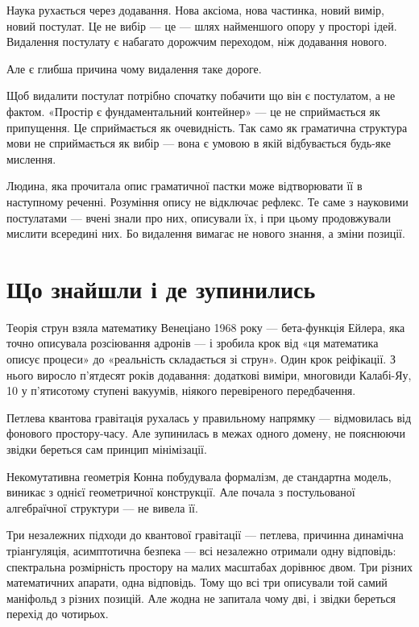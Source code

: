 \documentclass[12pt, a4paper, openany]{book}
\begin{document}
Наука рухається через додавання. Нова аксіома, нова частинка, новий вимір, новий постулат. Це не вибір — це — шлях найменшого опору у просторі ідей. Видалення постулату є набагато дорожчим переходом, ніж додавання нового.

Але є глибша причина чому видалення таке дороге.

Щоб видалити постулат потрібно спочатку побачити що він є постулатом, а не фактом. «Простір є фундаментальний контейнер» — це не сприймається як припущення. Це сприймається як очевидність. Так само як граматична структура мови не сприймається як вибір — вона є умовою в якій відбувається будь-яке мислення.

Людина, яка прочитала опис граматичної пастки може відтворювати її в наступному реченні. Розуміння опису не відключає рефлекс. Те саме з науковими постулатами — вчені знали про них, описували їх, і при цьому продовжували мислити всередині них. Бо видалення вимагає не нового знання, а зміни позиції.

\section{Що знайшли і де зупинились}

Теорія струн взяла математику Венеціано 1968 року — бета-функція Ейлера, яка точно описувала розсіювання адронів — і зробила крок від «ця математика описує процеси» до «реальність складається зі струн». Один крок реіфікації. З нього виросло п'ятдесят років додавання: додаткові виміри, многовиди Калабі-Яу, 10 у п'ятисотому ступені вакуумів, ніякого перевіреного передбачення.

Петлева квантова гравітація рухалась у правильному напрямку — відмовилась від фонового простору-часу. Але зупинилась в межах одного домену, не пояснюючи звідки береться сам принцип мінімізації.

Некомутативна геометрія Конна побудувала формалізм, де стандартна модель, виникає з однієї геометричної конструкції. Але почала з постульованої алгебраїчної структури — не вивела її.

Три незалежних підходи до квантової гравітації — петлева, причинна динамічна тріангуляція, асимптотична безпека — всі незалежно отримали одну відповідь: спектральна розмірність простору на малих масштабах дорівнює двом. Три різних математичних апарати, одна відповідь. Тому що всі три описували той самий маніфольд з різних позицій. Але жодна не запитала чому дві, і звідки береться перехід до чотирьох.
\end{document}
